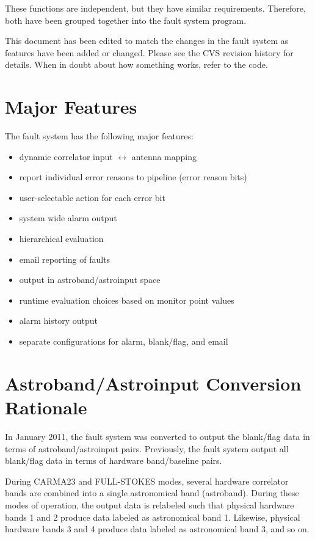 \documentclass[letterpaper,12pt,oneside,pdftex]{article}
\newenvironment{pitemize}{
\begin{itemize}
  \setlength{\itemsep}{1pt}
  \setlength{\parskip}{0pt}
  \setlength{\parsep}{0pt}
}{\end{itemize}}
\begin{document}
These functions are independent, but they have similar requirements. Therefore,
both have been grouped together into the fault system program.

This document has been edited to match the changes in the fault system as
features have been added or changed. Please see the CVS revision history for
details. When in doubt about how something works, refer to the code.

\section{Major Features}

The fault system has the following major features:
\begin{pitemize}
\item dynamic correlator input $\leftrightarrow$ antenna mapping
\item report individual error reasons to pipeline (error reason bits)
\item user-selectable action for each error bit
\item system wide alarm output
\item hierarchical evaluation
\item email reporting of faults
\item output in astroband/astroinput space
\item runtime evaluation choices based on monitor point values
\item alarm history output
\item separate configurations for alarm, blank/flag, and email
\end{pitemize}

\section{Astroband/Astroinput Conversion Rationale}

In January 2011, the fault system was converted to output the blank/flag data in
terms of astroband/astroinput pairs. Previously, the fault system output all
blank/flag data in terms of hardware band/baseline pairs.

During CARMA23 and FULL-STOKES modes, several hardware correlator bands are
combined into a single astronomical band (astroband). During these modes of
operation, the output data is relabeled such that physical hardware bands 1 and
2 produce data labeled as astronomical band 1. Likewise, physical hardware bands
3 and 4 produce data labeled as astronomical band 3, and so on.
\end{document}

